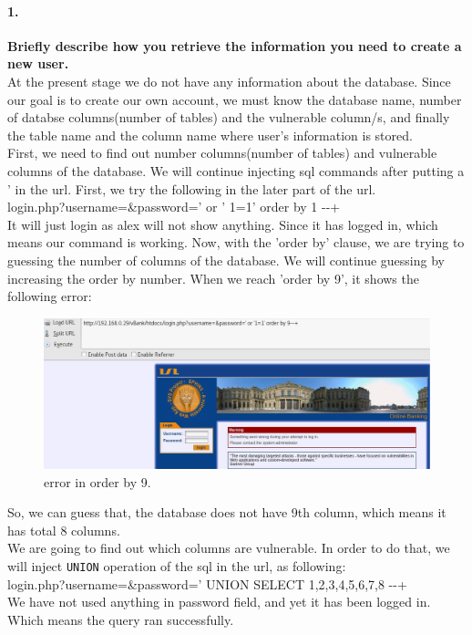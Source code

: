 \documentclass[12pt]{report}
\begin{document}
	\paragraph*{1.} {\bf Briefly describe how you retrieve the information you need to create a new user.}\\
	At the present stage we do not have any information about the database. Since our goal is to create our own account, we must know the database name, number of databse columns(number of tables) and the vulnerable column/s, and finally the table name and the column name where user's information is stored.\\
	First, we need to find out number columns(number of tables) and vulnerable columns of the database. We will continue injecting sql commands after putting a ' in the url. First, we try the following in the later part of the url.\\
	{\sf login.php?username=\&password=' or ' 1=1' order by 1 -{}-+}\\
	It will just login as alex will not show anything. Since it has logged in, which means our command is working. Now, with the 'order by' clause, we are trying to guessing the number of columns of the database. We will continue guessing by increasing the order by number. When we reach 'order by 9', it shows the following error:
	\begin{figure}[H]
		\includegraphics[width=0.75\textheight,height=0.3\textheight]{images/orderby.jpg}
		\caption{error in order by 9.}
	\end{figure}
	So, we can guess that, the database does not have 9th column, which means it has total 8 columns.\\
	We are going to find out which columns are vulnerable. In order to do that, we will inject {\tt UNION} operation of the sql in the url, as following:\\
	{\sf login.php?username=\&password=' UNION SELECT 1,2,3,4,5,6,7,8 -{}-+}\\
	We have not used anything in password field, and yet it has been logged in. Which means the query ran successfully. 
\end{document}
